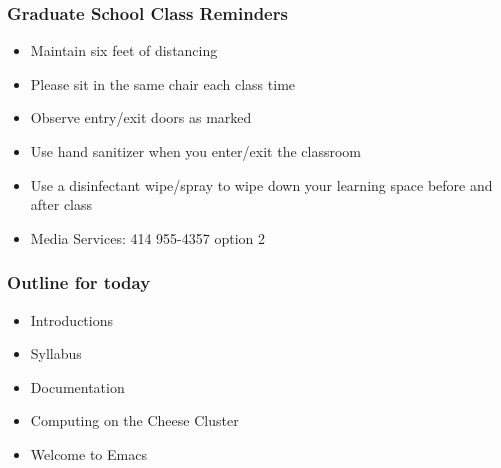\documentclass[11pt,pdftex,dvipsnames,usenames,helvetica]{beamer}
\begin{document}
\boldmath

\begin{frame}
\frametitle{Graduate School Class Reminders}

\begin{itemize}
\item Maintain six feet of distancing
\item Please sit in the same chair each class time
\item Observe entry/exit doors as marked
\item Use hand sanitizer when you enter/exit the classroom
\item Use a disinfectant wipe/spray to wipe down your learning space
  before and after class
\item Media Services: 414 955-4357 option 2
\end{itemize}

\end{frame}

\begin{frame}
\frametitle{Outline for today}

\begin{itemize}
\item Introductions
\item Syllabus 
\item Documentation 
\item Computing on the Cheese Cluster
\item Welcome to Emacs
\end{itemize}

\end{frame}
\end{document}
